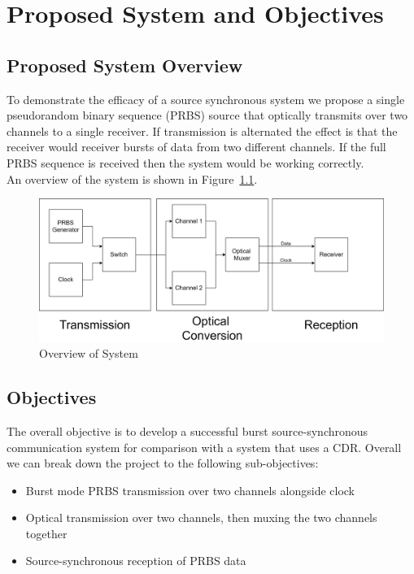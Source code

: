 \chapter{Proposed System and Objectives}

\section{Proposed System Overview}%
\label{sec:system_overview}
To demonstrate the efficacy of a source synchronous system we propose a single
pseudorandom binary sequence (PRBS) source that optically transmits over two
channels to a single receiver. If transmission is alternated the effect is that
the receiver would receiver bursts of data from two different channels. If the
full PRBS sequence is received then the system would be working correctly.\\ An
overview of the system is shown in Figure~\ref{fig:overview}. 

\begin{figure}[h]
    \centering
    \includegraphics[width=1\linewidth]{img/overview.png}
    \caption{Overview of System}%
    \label{fig:overview}
\end{figure}

\section{Objectives}%
\label{sec:objectives}
The overall objective is to develop a successful burst source-synchronous
communication system for comparison with a system that uses a CDR.
\noindent
Overall we can break down the project to the following sub-objectives: 
\begin{itemize}
    \item Burst mode PRBS transmission over two channels alongside clock
    \item Optical transmission over two channels, then muxing the two channels together
    \item Source-synchronous reception of PRBS data 
\end{itemize}
